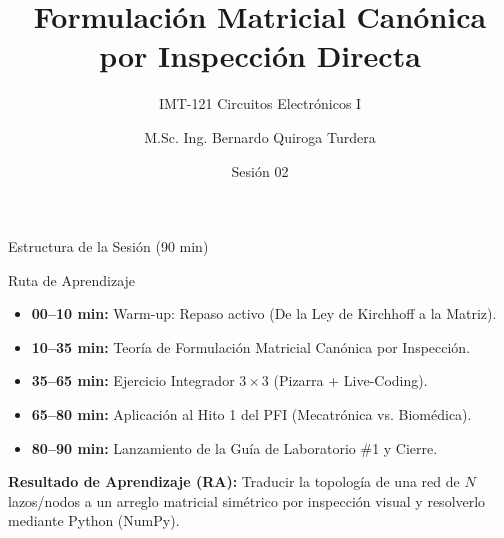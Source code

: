 \documentclass[aspectratio=169, 10pt]{beamer}
\title[Sesión 2: Redes en CC]{Formulación Matricial Canónica por Inspección Directa}
\subtitle{IMT-121 Circuitos Electrónicos I}
\author[B. Quiroga]{M.Sc. Ing. Bernardo Quiroga Turdera}
\institute[UCB Tarija]{Universidad Católica Boliviana ``San Pablo'' -- Sede Tarija}
\date{Sesión 02}
\begin{document}
\begin{frame}
    \titlepage
\end{frame}

\begin{frame}{Estructura de la Sesión (90 min)}
    \begin{block}{Ruta de Aprendizaje}
        \begin{itemize}
            \item \textbf{00--10 min:} Warm-up: Repaso activo (De la Ley de Kirchhoff a la Matriz).
            \item \textbf{10--35 min:} Teoría de Formulación Matricial Canónica por Inspección.
            \item \textbf{35--65 min:} Ejercicio Integrador $3\times 3$ (Pizarra + Live-Coding).
            \item \textbf{65--80 min:} Aplicación al Hito 1 del PFI (Mecatrónica vs. Biomédica).
            \item \textbf{80--90 min:} Lanzamiento de la Guía de Laboratorio \#1 y Cierre.
        \end{itemize}
    \end{block}
    \vspace{0.5cm}
    \textbf{Resultado de Aprendizaje (RA):} Traducir la topología de una red de $N$ lazos/nodos a un arreglo matricial simétrico por inspección visual y resolverlo mediante Python (NumPy).
\end{frame}
\end{document}
